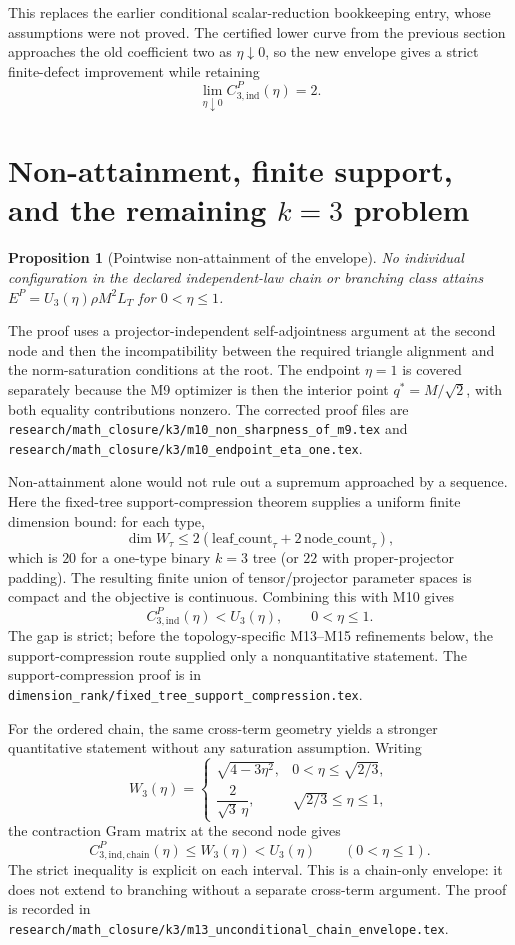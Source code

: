 \documentclass[11pt]{amsart}
\newtheorem{proposition}[theorem]{Proposition}
\theoremstyle{definition}
\theoremstyle{remark}
\begin{document}
This replaces the earlier conditional scalar-reduction bookkeeping entry,
whose assumptions were not proved. The certified lower curve from the
previous section approaches the old coefficient two as $\eta\downarrow0$,
so the new envelope gives a strict finite-defect improvement while retaining
\[
 \lim_{\eta\downarrow0}C_{3,\mathrm{ind}}^P(\eta)=2.
\]

\section{Non-attainment, finite support, and the remaining $k=3$ problem}

\begin{proposition}[Pointwise non-attainment of the envelope]
\label{prop:k3nonattainment}
No individual configuration in the declared independent-law chain or
branching class attains $E^P=U_3(\eta)\rho M^2L_T$ for $0<\eta\le1$.
\end{proposition}

The proof uses a projector-independent self-adjointness argument at the second
node and then the incompatibility between the required triangle alignment and
the norm-saturation conditions at the root. The endpoint $\eta=1$ is covered
separately because the M9 optimizer is then the interior point
$q^*=M/\sqrt2$, with both equality contributions nonzero. The corrected proof
files are
\texttt{research/math\_closure/k3/m10\_non\_sharpness\_of\_m9.tex} and
\texttt{research/math\_closure/k3/m10\_endpoint\_eta\_one.tex}.

Non-attainment alone would not rule out a supremum approached by a sequence.
Here the fixed-tree support-compression theorem supplies a uniform finite
dimension bound: for each type,
\[
\dim W_\tau\le2(\mathrm{leaf\_count}_\tau+2\,\mathrm{node\_count}_\tau),
\]
which is $20$ for a one-type binary $k=3$ tree (or $22$ with proper-projector
padding). The resulting finite union of tensor/projector parameter spaces is
compact and the objective is continuous. Combining this with M10 gives
\[
  C_{3,\mathrm{ind}}^P(\eta)<U_3(\eta),
  \qquad 0<\eta\le1.
\]
The gap is strict; before the topology-specific M13--M15 refinements below,
the support-compression route supplied only a nonquantitative statement. The
support-compression proof is in
\texttt{dimension\_rank/fixed\_tree\_support\_compression.tex}.

For the ordered chain, the same cross-term geometry yields a stronger
quantitative statement without any saturation assumption. Writing
\[
 W_3(\eta)=
 \begin{cases}
 \sqrt{4-3\eta^2}, & 0<\eta\le\sqrt{2/3},\\[1mm]
 \dfrac{2}{\sqrt3\,\eta}, & \sqrt{2/3}\le\eta\le1,
 \end{cases}
\]
the contraction Gram matrix at the second node gives
\[
 C_{3,\mathrm{ind},\mathrm{chain}}^P(\eta)\le W_3(\eta)<U_3(\eta)
 \qquad (0<\eta\le1).
\]
The strict inequality is explicit on each interval. This is a chain-only
envelope: it does not extend to branching without a separate cross-term
argument. The proof is recorded in
\texttt{research/math\_closure/k3/m13\_unconditional\_chain\_envelope.tex}.
\end{document}
